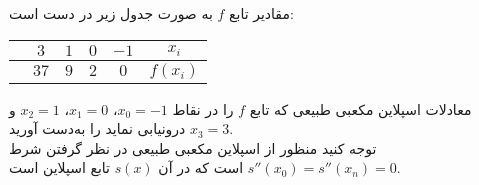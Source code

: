 مقادیر تابع 
\(f\)
به صورت جدول زیر در دست است:
\begin{center}
	\begin{tabular}{ccccc|c}
		& \(3\) &\(1\)&\(0\) & \(-1\) & \(x_i\)\\
		\hline
		& \(37\) & \(9\) & \(2\) &\(0\) & \(f(x_i)\)
	\end{tabular}
\end{center}
معادلات اسپلاین مکعبی طبیعی  که تابع 
\(f\)
را در نقاط
\(x_0=-1\)،
\(x_1=0\)،
\(x_2=1\) 
و  
\(x_3=3\)
درونیابی نماید را به‌دست آورید.\\
توجه کنید منظور از اسپلاین مکعبی طبیعی در نظر گرفتن شرط
\(s''(x_0) = s''(x_n) = 0\)
است که در آن
\(s(x)\)
تابع اسپلاین  است. 
